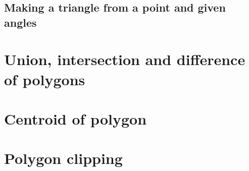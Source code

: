 \documentclass[12pt,openany,a4,usenames,dvipsnames]{book}
\begin{document}
\section{Making a triangle from a point and given angles}
\skelpar%
\chapter{Union, intersection and difference of polygons}
\skelpar%
\chapter{Centroid of polygon}
\skelpar%
\chapter{Polygon clipping}%
\skelpar%
\end{document}
